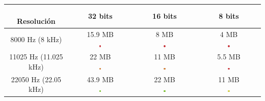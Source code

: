 \documentclass[11pt,a4paper]{article}
\begin{document}
\begin{table}[H]
\centering
\begin{tabular}{|c|c|c|c|}
\hline
\diagbox[width=15em]{Frecuencia\\de muestreo}{\\Resolución} & 32 bits & 16 bits & 8 bits  \\ \hline

8000 Hz (8 kHz) & \makecell{15.9 MB\\ \includegraphics[width=0.03\textwidth]{mm.png}} & \makecell{8 MB\\ \includegraphics[width=0.03\textwidth]{mm.png}} & \makecell{4 MB\\ \includegraphics[width=0.03\textwidth]{mm.png}} \\ \hline

11025 Hz (11.025 kHz) & \makecell{22 MB\\ \includegraphics[width=0.03\textwidth]{m.png}} & \makecell{11 MB\\ \includegraphics[width=0.03\textwidth]{m.png}} & \makecell{5.5 MB\\ \includegraphics[width=0.03\textwidth]{mm.png}} \\ \hline

22050 Hz (22.05 kHz) & \makecell{43.9 MB\\ \includegraphics[width=0.03\textwidth]{b.png}} & \makecell{22 MB\\ \includegraphics[width=0.03\textwidth]{b.png}} & \makecell{11 MB\\ \includegraphics[width=0.03\textwidth]{r.png}} \\ \hline


\end{tabular}
\end{table}
\end{document}
